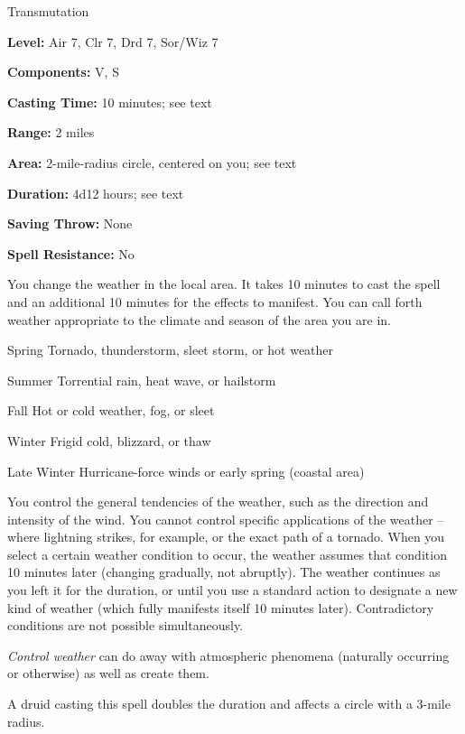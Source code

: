 
Transmutation

\textbf{Level:} Air 7, Clr 7, Drd 7, Sor/Wiz 7

\textbf{Components:} V, S

\textbf{Casting Time:} 10 minutes; see text

\textbf{Range:} 2 miles

\textbf{Area:} 2-mile-radius circle, centered on you; see text

\textbf{Duration:} 4d12 hours; see text

\textbf{Saving Throw:} None

\textbf{Spell Resistance:} No

You change the weather in the local area. It takes 10 minutes to cast the spell 
and an additional 10 minutes for the effects to manifest. You can call 
forth weather appropriate to the climate and season of the area you are in.

\begin{description*}
\item[Spring] Tornado, thunderstorm, sleet storm, or hot weather
\item[Summer] Torrential rain, heat wave, or hailstorm
\item[Fall] Hot or cold weather, fog, or sleet
\item[Winter] Frigid cold, blizzard, or thaw
\item[Late Winter] Hurricane-force winds or early spring (coastal area)
\end{description*}

You control the general tendencies of the weather, such as the direction and intensity 
of the wind. You cannot control specific applications of the weather -- where lightning 
strikes, for example, or the exact path of a tornado. When you select a certain 
weather condition to occur, the weather assumes that condition 10 minutes later 
(changing gradually, not abruptly). The weather continues as you left it for the 
duration, or until you use a standard action to designate a new kind of weather 
(which fully manifests itself 10 minutes later). Contradictory conditions are not 
possible simultaneously.

\textit{Control weather} can do away with atmospheric phenomena (naturally occurring 
or otherwise) as well as create them.

A druid casting this spell doubles the duration and affects a circle with a 3-mile 
radius.

